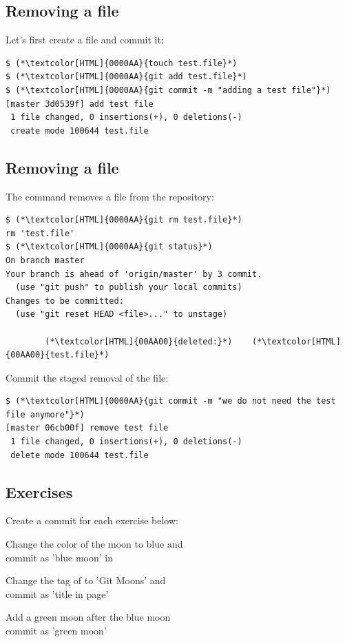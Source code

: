 \subsection{Removing a file}
\begin{frame}[fragile]
\subslidetitle
  Let's first create a file and commit it:
\begin{lstlisting}
$ (*\textcolor[HTML]{0000AA}{touch test.file}*)
$ (*\textcolor[HTML]{0000AA}{git add test.file}*)
$ (*\textcolor[HTML]{0000AA}{git commit -m "adding a test file"}*)
[master 3d0539f] add test file
 1 file changed, 0 insertions(+), 0 deletions(-)
 create mode 100644 test.file
\end{lstlisting}
\end{frame}

\subsection{Removing a file}
\begin{frame}[fragile]
\subslidetitle
  The command  removes a file from the repository:
\begin{lstlisting}
$ (*\textcolor[HTML]{0000AA}{git rm test.file}*)
rm 'test.file'
$ (*\textcolor[HTML]{0000AA}{git status}*)
On branch master
Your branch is ahead of 'origin/master' by 3 commit.
  (use "git push" to publish your local commits)
Changes to be committed:
  (use "git reset HEAD <file>..." to unstage)

        (*\textcolor[HTML]{00AA00}{deleted:}*)    (*\textcolor[HTML]{00AA00}{test.file}*)
\end{lstlisting}

  Commit the staged removal of the file:
  \begin{lstlisting}
$ (*\textcolor[HTML]{0000AA}{git commit -m "we do not need the test file anymore"}*)
[master 06cb00f] remove test file
 1 file changed, 0 insertions(+), 0 deletions(-)
 delete mode 100644 test.file
\end{lstlisting}

\end{frame}

\subsection{Exercises}
\begin{frame}[fragile]
\subslidetitle
  Create a commit for each exercise below:
  \begin{exercise}
    \item Change the color of the moon to blue and\\
      commit as 'blue moon' in 
    \item Change the  tag of  to 'Git Moons' and\\
      commit as 'title in page'
    \item Add a green moon after the blue moon\\
      commit as 'green moon'
  \end{exercise}

\end{frame}

